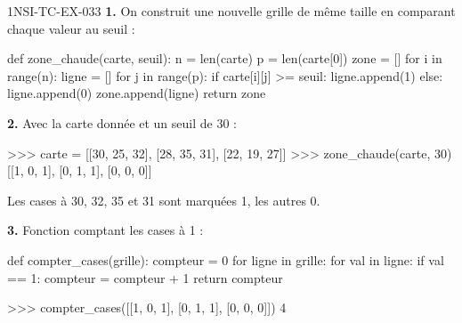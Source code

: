 \begin{corrige}{1NSI-TC-EX-033}
\textbf{1.} On construit une nouvelle grille de même taille en comparant chaque valeur au seuil :

\begin{python}
def zone_chaude(carte, seuil):
    n = len(carte)
    p = len(carte[0])
    zone = []
    for i in range(n):
        ligne = []
        for j in range(p):
            if carte[i][j] >= seuil:
                ligne.append(1)
            else:
                ligne.append(0)
        zone.append(ligne)
    return zone
\end{python}

\textbf{2.} Avec la carte donnée et un seuil de 30 :

\begin{console}
>>> carte = [[30, 25, 32], [28, 35, 31], [22, 19, 27]]
>>> zone_chaude(carte, 30)
[[1, 0, 1], [0, 1, 1], [0, 0, 0]]
\end{console}

Les cases à 30, 32, 35 et 31 sont marquées 1, les autres 0.

\textbf{3.} Fonction comptant les cases à 1 :

\begin{python}
def compter_cases(grille):
    compteur = 0
    for ligne in grille:
        for val in ligne:
            if val == 1:
                compteur = compteur + 1
    return compteur
\end{python}

\begin{console}
>>> compter_cases([[1, 0, 1], [0, 1, 1], [0, 0, 0]])
4
\end{console}
\end{corrige}
